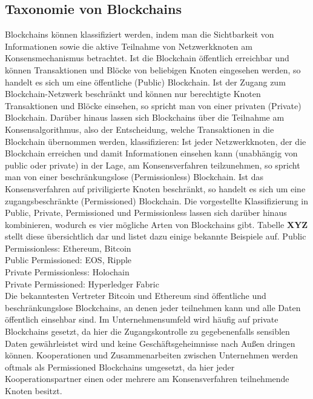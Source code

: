 \subsection{Taxonomie von Blockchains}
\label{subsec:fundamentals:dlt:taxonomy}
Blockchains können klassifiziert werden, indem man die Sichtbarkeit von Informationen sowie die aktive Teilnahme von Netzwerkknoten am Konsensmechanismus betrachtet. Ist die Blockchain öffentlich erreichbar und können Transaktionen und Blöcke von beliebigen Knoten eingesehen werden, so handelt es sich um eine öffentliche (Public) Blockchain. Ist der Zugang zum Blockchain-Netzwerk beschränkt und können nur berechtigte Knoten Transaktionen und Blöcke einsehen, so spricht man von einer privaten (Private) Blockchain. Darüber hinaus lassen sich Blockchains über die Teilnahme am Konsensalgorithmus, also der Entscheidung, welche Transaktionen in die Blockchain übernommen werden, klassifizieren: Ist jeder Netzwerkknoten, der die Blockchain erreichen und damit Informationen einsehen kann (unabhängig von public oder private) in der Lage, am Konsensverfahren teilzunehmen, so spricht man von einer beschränkungslose (Permissionless) Blockchain. Ist das Konsensverfahren auf priviligierte Knoten beschränkt, so handelt es sich um eine zugangsbeschränkte (Permissioned) Blockchain. Die vorgestellte Klassifizierung in Public, Private, Permissioned und Permissionless lassen sich darüber hinaus kombinieren, wodurch es vier mögliche Arten von Blockchains gibt. Tabelle \textbf{XYZ} stellt diese übersichtlich dar und listet dazu einige bekannte Beispiele auf.
Public Permissionless: Ethereum, Bitcoin\\
Public Permissioned: EOS, Ripple\\
Private Permissionless: Holochain\\
Private Permissioned: Hyperledger Fabric\\
\cite{8029379}
Die bekanntesten Vertreter Bitcoin und Ethereum sind öffentliche und beschränkungslose Blockchains, an denen jeder teilnehmen kann und alle Daten öffentlich einsehbar sind. Im Unternehmensumfeld wird häufig auf private Blockchains gesetzt, da hier die Zugangskontrolle zu gegebenenfalls sensiblen Daten gewährleistet wird und keine Geschäftsgeheimnisse nach Außen dringen können. Kooperationen und Zusammenarbeiten zwischen Unternehmen werden oftmals als Permissioned Blockchains umgesetzt, da hier jeder Kooperationspartner einen oder mehrere am Konsensverfahren teilnehmende Knoten besitzt.


